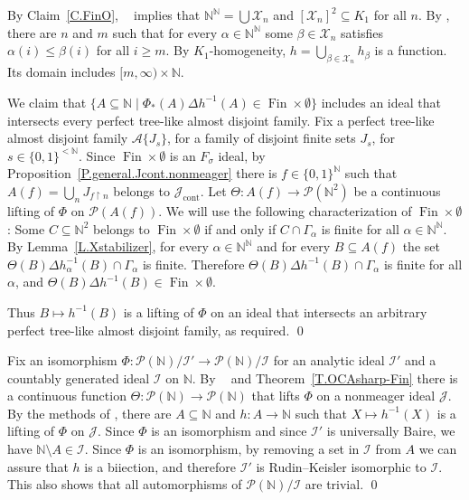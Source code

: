 \documentclass{amsart}
\makeatletter
\def\N{\mathbb N}                        %
\def\Fin{{\rm Fin}}   %
\def\FinO{\Fin\times\emptyset}
\def\rs{\restriction}
\theoremstyle{definition}
\theoremstyle{remark}
\def\twolo{\{0,1\}^{<\N}}
\def\twoo{\{0,1\}^{\N}}
\def\Fin{\operatorname{Fin}}
\def\FinO{\Fin\times\emptyset}
\DeclareMathOperator{\Ccont}{cont}
\newcommand{\Jcont}{\cJ_{\Ccont}}
\renewcommand{\proofname}{Proof}
\renewenvironment{proof}[1][\proofname]{\par
\let\oldqedsymbol\qedsymbol             %
  \normalfont
  \topsep6\p@\@plus6\p@ \trivlist
  \item[\hskip\labelsep\hskip\parindent\scshape
    #1\@addpunct{.}]\ignorespaces
}{%
  \qed\endtrivlist
\global\let\qedsymbol\oldqedsymbol      %
}
\newcommand{\cP}{\mathcal P}
\newcommand{\bbN}{\mathbb N}
\newcommand{\cI}{{\mathcal I}} %
\newcommand{\cJ}{{\mathcal J}} %
\newcommand{\cA}{\mathcal A}
\newcommand{\cX}{\mathcal X}
\DeclareMathOperator{\OCAT}{OCA_T}
\newcommand{\bbNN}{\bbN^\bbN}
\newcommand{\cPN}{\cP(\bbN)}
\numberwithin{claim}{subsection}
\makeatother
\begin{document}
\begin{proof}[Proof of Theorem~\ref{T.OCAsharp-Fin}]
	By Claim~\ref{C.FinO}, $\OCAT$ implies that $\bbNN=\bigcup\cX_n$ and $[\cX_n]^2\subseteq K_1$ for all $n$. By \cite{Ku:Box}, there are $n$ and $m$ such that for every $\alpha\in \bbNN$ some $\beta\in \cX_n$ satisfies $\alpha(i)\leq \beta(i)$ for all $i\geq m$. By $K_1$-homogeneity, $h=\bigcup_{\beta\in \cX_n} h_\beta$ is a function. Its domain includes $[m,\infty)\times \bbN$. 
	
	
	We claim that $\{A\subseteq \bbN\mid \Phi_*(A)\Delta h^{-1}(A)\in \FinO\}$ includes an ideal that intersects every perfect tree-like almost disjoint family. 
	Fix a perfect tree-like almost disjoint family $\cA\{J_s\}$, for a family of disjoint finite sets $J_s$, for $s\in \twolo$. Since $\FinO$ is an $F_\sigma$ ideal, by Proposition~\ref{P.general.Jcont.nonmeager} there is $f\in \twoo$ such that $A(f)=\bigcup_n J_{f\rs n}$ belongs to $ \Jcont$. Let $\Theta\colon A(f)\to \cP(\bbN^2)$ be a continuous lifting of $\Phi$ on $\cP(A(f))$. 
	We will use the following characterization of $\FinO$: Some  $C\subseteq \bbN^2$ belongs to $\FinO$ if and only if $C\cap \Gamma_\alpha$ is finite for all $\alpha\in \bbNN$. 
	By Lemma~\ref{L.Xstabilizer}, for every $\alpha\in \bbNN$ and for every $B\subseteq A(f)$ the set $\Theta(B)\Delta h_\alpha^{-1}(B)\cap \Gamma_\alpha$ is finite. Therefore $\Theta(B)\Delta h^{-1}(B)\cap \Gamma_\alpha$ is finite for all $\alpha$, and $\Theta(B)\Delta h^{-1}(B)\in \FinO$. 
	
	Thus $B\mapsto h^{-1}(B)$ is a lifting of $\Phi$ on an ideal that intersects an arbitrary perfect tree-like almost disjoint family, as required. 
		\end{proof}


\begin{proof}[Proof of Theorem~\ref{T.OCAonly}] Fix an isomorphism $\Phi\colon \cPN/\cI'\to \cPN/\cI$ for an analytic ideal $\cI'$ and a countably generated ideal $\cI$ on $\bbN$. 
	By $\OCAT$ and Theorem~\ref{T.OCAsharp-Fin} there is a continuous function $\Theta\colon \cPN\to \cPN$ that lifts $\Phi$ on a nonmeager ideal $\cJ$. By the methods of \cite[\S 1]{Fa:AQ}, there are $A\subseteq \bbN$ and $h\colon A\to \bbN$ such that $X\mapsto h^{-1}(X)$ is a lifting of $\Phi$ on $\cJ$. Since $\Phi$ is an isomorphism and since $\cI'$ is universally Baire, we have $\bbN\setminus A\in \cI$. Since $\Phi$ is an isomorphism, by removing a set in $\cI$ from $A$ we can assure that $h$ is a biiection, and therefore $\cI'$ is Rudin--Keisler isomorphic to $\cI$. This also shows that all automorphisms of $\cPN/\cI$ are trivial. 
\end{proof}
\end{document}
